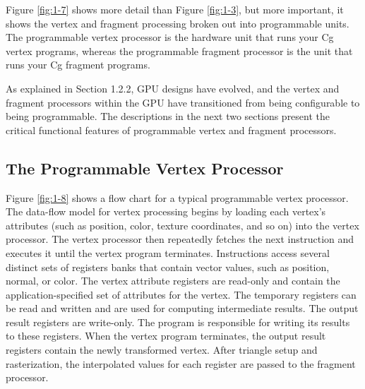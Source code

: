 \documentclass{book}
\begin{document}
Figure \ref{fig:1-7} shows more detail than Figure \ref{fig:1-3}, but more important, it shows the vertex and fragment processing broken out into programmable units. The programmable vertex processor is the hardware unit that runs your Cg vertex programs, whereas the programmable fragment processor is the unit that runs your Cg fragment programs.

As explained in Section 1.2.2, GPU designs have evolved, and the vertex and fragment processors within the GPU have transitioned from being configurable to being programmable. The descriptions in the next two sections present the critical functional features of programmable vertex and fragment processors.

\subsection*{The Programmable Vertex Processor}

Figure \ref{fig:1-8} shows a flow chart for a typical programmable vertex processor. The data-flow model for vertex processing begins by loading each vertex's attributes (such as position, color, texture coordinates, and so on) into the vertex processor. The vertex processor then repeatedly fetches the next instruction and executes it until the vertex program terminates. Instructions access several distinct sets of registers banks that contain vector values, such as position, normal, or color. The vertex attribute registers are read-only and contain the application-specified set of attributes for the vertex. The temporary registers can be read and written and are used for computing intermediate results. The output result registers are write-only. The program is responsible for writing its results to these registers. When the vertex program terminates, the output result registers contain the newly transformed vertex. After triangle setup and rasterization, the interpolated values for each register are passed to the fragment processor.
\end{document}
